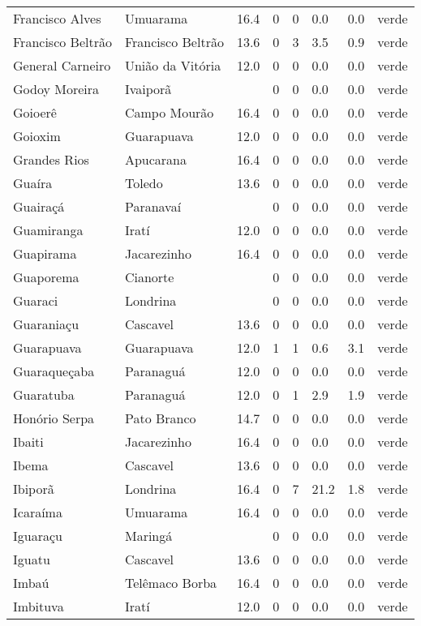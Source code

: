 \begin{longtable}{l|lllllll}
  Francisco Alves & Umuarama & 16.4 & 0 & 0 & 0.0 & 0.0 & verde \\ 
  Francisco Beltrão & Francisco Beltrão & 13.6 & 0 & 3 & 3.5 & 0.9 & verde \\ 
  General Carneiro & União da Vitória & 12.0 & 0 & 0 & 0.0 & 0.0 & verde \\ 
  Godoy Moreira & Ivaiporã &  & 0 & 0 & 0.0 & 0.0 & verde \\ 
  Goioerê & Campo Mourão & 16.4 & 0 & 0 & 0.0 & 0.0 & verde \\ 
  Goioxim & Guarapuava & 12.0 & 0 & 0 & 0.0 & 0.0 & verde \\ 
  Grandes Rios & Apucarana & 16.4 & 0 & 0 & 0.0 & 0.0 & verde \\ 
  Guaíra & Toledo & 13.6 & 0 & 0 & 0.0 & 0.0 & verde \\ 
  Guairaçá & Paranavaí &  & 0 & 0 & 0.0 & 0.0 & verde \\ 
  Guamiranga & Iratí & 12.0 & 0 & 0 & 0.0 & 0.0 & verde \\ 
  Guapirama & Jacarezinho & 16.4 & 0 & 0 & 0.0 & 0.0 & verde \\ 
  Guaporema & Cianorte &  & 0 & 0 & 0.0 & 0.0 & verde \\ 
  Guaraci & Londrina &  & 0 & 0 & 0.0 & 0.0 & verde \\ 
  Guaraniaçu & Cascavel & 13.6 & 0 & 0 & 0.0 & 0.0 & verde \\ 
  Guarapuava & Guarapuava & 12.0 & 1 & 1 & 0.6 & 3.1 & verde \\ 
  Guaraqueçaba & Paranaguá & 12.0 & 0 & 0 & 0.0 & 0.0 & verde \\ 
  Guaratuba & Paranaguá & 12.0 & 0 & 1 & 2.9 & 1.9 & verde \\ 
  Honório Serpa & Pato Branco & 14.7 & 0 & 0 & 0.0 & 0.0 & verde \\ 
  Ibaiti & Jacarezinho & 16.4 & 0 & 0 & 0.0 & 0.0 & verde \\ 
  Ibema & Cascavel & 13.6 & 0 & 0 & 0.0 & 0.0 & verde \\ 
  Ibiporã & Londrina & 16.4 & 0 & 7 & 21.2 & 1.8 & verde \\ 
  Icaraíma & Umuarama & 16.4 & 0 & 0 & 0.0 & 0.0 & verde \\ 
  Iguaraçu & Maringá &  & 0 & 0 & 0.0 & 0.0 & verde \\ 
  Iguatu & Cascavel & 13.6 & 0 & 0 & 0.0 & 0.0 & verde \\ 
  Imbaú & Telêmaco Borba & 16.4 & 0 & 0 & 0.0 & 0.0 & verde \\ 
  Imbituva & Iratí & 12.0 & 0 & 0 & 0.0 & 0.0 & verde \\ 

\end{longtable}
